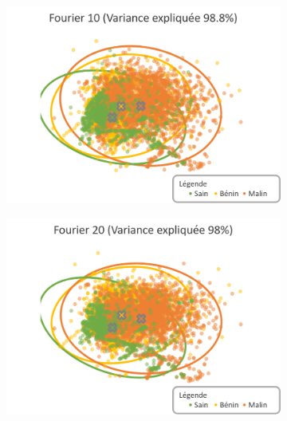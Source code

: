 \begin{figure}[p]
    \centering
    \begin{subfigure}{.49\textwidth}
      \includegraphics[width=\textwidth]{contents/chapter_4/resources/visualisation_frequency_Fourier10.png}
    \end{subfigure}
    \begin{subfigure}{.49\textwidth}
      \includegraphics[width=\textwidth]{contents/chapter_4/resources/visualisation_frequency_Fourier20.png}
    \end{subfigure}
    

\end{figure}

